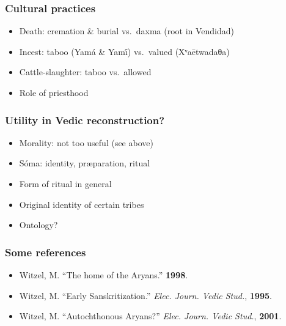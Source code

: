 \documentclass[pdf]{beamer}
\begin{document}
\begin{frame} \frametitle{Cultural practices}
\begin{itemize}
	\item Death: cremation \& burial vs.~daxma (root in Vendidad)
	\item Incest: taboo (Yamá \& Yamī́) vs.~valued (Xᵛaētwadaθa)
	\item Cattle-slaughter: taboo vs.~allowed
	\item Role of priesthood
\end{itemize}
\end{frame}

\begin{frame} \frametitle{Utility in Vedic reconstruction?}
\begin{itemize}
	\item Morality: not too useful (see above)
	\item Sóma: identity, præparation, ritual
	\item Form of ritual in general
	\item Original identity of certain tribes
	\item Ontology?
\end{itemize}
\end{frame}

\begin{frame} \frametitle{Some references}
\begin{itemize}
	\item Witzel, M. ``The home of the Aryans.'' \textbf{1998}.
	\item Witzel, M. ``Early Sanskritization.'' \textit{Elec. Journ. Vedic Stud.}, \textbf{1995}.
	\item Witzel, M. ``Autochthonous Aryans?'' \textit{Elec. Journ. Vedic Stud.}, \textbf{2001}.
\end{itemize}
\end{frame}

\end{document}
